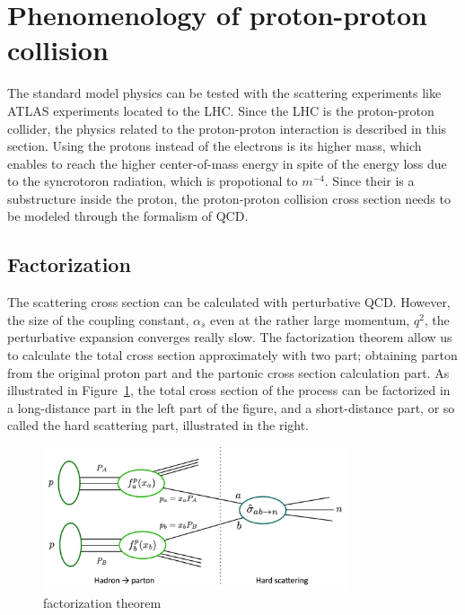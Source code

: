 \section{Phenomenology of proton-proton collision}
The standard model physics can be tested with the scattering experiments like ATLAS experiments located to the LHC.
Since the LHC is the proton-proton collider, the physics related to the proton-proton interaction is described in this section. Using the protons instead of the electrons is its higher mass, which enables to reach the higher center-of-mass energy in spite of the energy loss due to the syncrotoron radiation, which is propotional to $m^{-4}$.
Since their is a substructure inside the proton, the proton-proton collision cross section needs to be modeled through the formalism of QCD.

\subsection{Factorization}
\label{subsec:factorization}

The scattering cross section can be calculated with perturbative QCD. 
However, the size of the coupling constant, $\alpha_s$ even at the rather large momentum, $q^2$, the perturbative expansion converges really slow.
The factorization theorem \cite{} allow us to calculate the total cross section approximately with two part; obtaining parton from the original proton part and the partonic cross section calculation part.
As illustrated in Figure~\ref{fig:factorization}, the total cross section of the process can be factorized in a long-distance part in the left part of the figure, and a short-distance part, or so called the hard scattering part, illustrated in the right.

\begin{figure}[tbp]
\begin{center}
 \includegraphics[width=0.8\textwidth,keepaspectratio]{figures/factorization}
\caption{
 factorization theorem 
}
\label{fig:factorization}
\end{center}
\end{figure}

